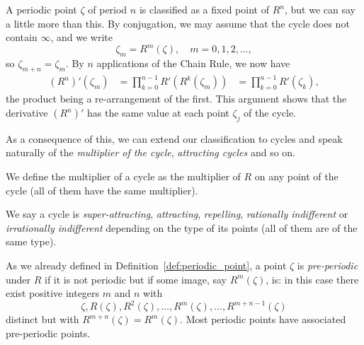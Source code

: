 \begin{remark}[$(R^n)'(\zeta_m) = \prod_{k=0}^{n-1} R'(\zeta_k)$]
    A periodic point $\zeta$ of period $n$ is classified as a fixed point of
    $R^n$, but we can say a little more than this. By conjugation, we may assume
    that the cycle does not contain $\infty$, and we write
    \begin{equation*}
        \zeta_m = R^m(\zeta), \quad m = 0, 1, 2, \dots,
    \end{equation*}
    so $\zeta_{m+n} = \zeta_m$. By $n$ applications of the Chain Rule, we now
    have
    \begin{align*}
        (R^n)'(\zeta_m) &= \prod_{k=0}^{n-1} R'(R^k(\zeta_m))
                        &= \prod_{k=0}^{n-1} R'(\zeta_k),
    \end{align*}
    the product being a re-arrangement of the first. This argument shows that
    the derivative $(R^n)'$ has the same value at each point $\zeta_j$ of the
    cycle.
\end{remark}

As a consequence of this, we can extend our classification to cycles and speak
naturally of the \emph{multiplier of the cycle}, \emph{attracting cycles} and so
on.

\begin{definition}
    We define the multiplier of a cycle as the multiplier of $R$ on any point of
    the cycle (all of them have the same multiplier).
\end{definition}

\begin{definition}
    We say a cycle is \emph{super-attracting}, \emph{attracting},
    \emph{repelling}, \emph{rationally indifferent} or \emph{irrationally
    indifferent} depending on the type of its points (all of them are of the
    same type).
\end{definition}

As we already defined in Definition~\ref{def:periodic_point}, a point $\zeta$ is
\emph{pre-periodic} under $R$ if it is not periodic but if some image, say
$R^m(\zeta)$, is: in this case there exist positive integers $m$ and $n$ with
\begin{equation*}
    \zeta, R(\zeta), R^2(\zeta), \dots, R^m(\zeta), \dots, R^{m+n-1}(\zeta)
\end{equation*}
distinct but with $R^{m+n}(\zeta) = R^m(\zeta)$. Most periodic points have
associated pre-periodic points.

